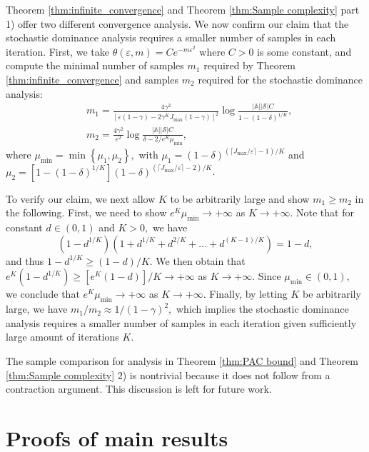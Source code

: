 \documentclass[12pt,technote,onecolumn]{IEEEtran}
\begin{document}
Theorem \ref{thm:infinite_convergence} and Theorem \ref{thm:Sample complexity} part 1)
offer two different convergence analysis. We now confirm our claim
that the stochastic dominance analysis requires a smaller number of
samples in each iteration. First, we take $\theta\left(\varepsilon,m\right)=Ce^{-m\varepsilon^{2}}$
where $C>0$ is some constant, and compute the minimal number of samples
$m_{1}$ required by Theorem \ref{thm:infinite_convergence} and samples
$m_{2}$ required for the stochastic dominance analysis:
\begin{equation*}
\begin{aligned}
	&   m_{1}=\frac{4\gamma^{2}}{\left[\varepsilon\left(1-\gamma\right)-2\gamma^{K}J_{\max}\left(1-\gamma\right)\right]^{2}}\log\frac{\left|\mathbb{A}\right|\left|\mathcal{S}\right|C}{1-\left(1-\delta\right)^{1/K}},\\
	&   m_{2}=\frac{4\gamma^{2}}{\varepsilon^{2}}\log\frac{\left|\mathbb{A}\right|\left|\mathcal{S}\right|C}{\delta-2/e^{K}\mu_{\min}},
\end{aligned}
\end{equation*}
where
$
\mu_{\min}=\min\left\{\mu_1,\mu_2\right\},
$
with $\mu_1=(1-\delta)^{(\lceil J_{\max}/\varepsilon\rceil -1)/K}$ and $\mu_2=[1-(1-\delta)^{1/K}](1-\delta)^{(\lceil J_{\max}/\varepsilon\rceil -2)/K}$.

To verify our claim, we next allow $K$ to be arbitrarily large and
show $m_{1}\geq m_{2}$ in the following. First, we need to show $e^{K}\mu_{\min}\rightarrow+\infty$
as $K\rightarrow+\infty.$ Note that for constant $d\in\left(0,1\right)$
and $K>0,$ we have
$$
(1-d^{1/K})(1+d^{1/K}+d^{2/K}+\dots+d^{\left(K-1\right)/K})=1-d,
$$
and thus $1-d^{1/K}\geq{(1-d)}/{K}.$ We then obtain that $e^{K}(1-d^{1/K})\geq{[e^{K}(1-d)]}/{K}\rightarrow+\infty$
as $K\rightarrow+\infty.$ Since $\mu_{\min}\in\left(0,1\right),$
we conclude that $e^{K}\mu_{\min}\rightarrow+\infty$ as $K\rightarrow+\infty.$
Finally, by letting $K$ be arbitrarily large, we have $m_{1}/m_{2}\approx{1}/{(1-\gamma)^{2}},$
which implies the stochastic dominance analysis requires a smaller
number of samples in each iteration given sufficiently large amount
of iterations $K.$

The sample comparison for analysis in Theorem \ref{thm:PAC bound}
and Theorem \ref{thm:Sample complexity} 2) is nontrivial because
it does not follow from a contraction argument. This discussion is
left for future work.

\section{Proofs of main results}\label{sec6}
\end{document}
